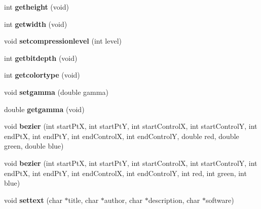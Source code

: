 \begin{DoxyCompactItemize}
\item 
\hypertarget{classpngwriter_a2359608ccf7fc25cbb271f49ebe5ea1e}{}int {\bfseries getheight} (void)\label{classpngwriter_a2359608ccf7fc25cbb271f49ebe5ea1e}

\item 
\hypertarget{classpngwriter_a66459b80d7c2380a5aa9139eafc5328c}{}int {\bfseries getwidth} (void)\label{classpngwriter_a66459b80d7c2380a5aa9139eafc5328c}

\item 
\hypertarget{classpngwriter_a338e4770832c68b109bf5ff514722c7c}{}void {\bfseries setcompressionlevel} (int level)\label{classpngwriter_a338e4770832c68b109bf5ff514722c7c}

\item 
\hypertarget{classpngwriter_aa851a74c99bfa6d426b1dfb2de470674}{}int {\bfseries getbitdepth} (void)\label{classpngwriter_aa851a74c99bfa6d426b1dfb2de470674}

\item 
\hypertarget{classpngwriter_a814068190845ff275a4b6377c8db6886}{}int {\bfseries getcolortype} (void)\label{classpngwriter_a814068190845ff275a4b6377c8db6886}

\item 
\hypertarget{classpngwriter_ac9dc81fca2f48ae6b9455672a255e231}{}void {\bfseries setgamma} (double gamma)\label{classpngwriter_ac9dc81fca2f48ae6b9455672a255e231}

\item 
\hypertarget{classpngwriter_a1103cd732336177a0acd57816b849927}{}double {\bfseries getgamma} (void)\label{classpngwriter_a1103cd732336177a0acd57816b849927}

\item 
\hypertarget{classpngwriter_a0a44e9268b006783d4b11f9b6d9012d3}{}void {\bfseries bezier} (int start\+Pt\+X, int start\+Pt\+Y, int start\+Control\+X, int start\+Control\+Y, int end\+Pt\+X, int end\+Pt\+Y, int end\+Control\+X, int end\+Control\+Y, double red, double green, double blue)\label{classpngwriter_a0a44e9268b006783d4b11f9b6d9012d3}

\item 
\hypertarget{classpngwriter_af29ac570c8d1e2eafbe6f43ed69e6829}{}void {\bfseries bezier} (int start\+Pt\+X, int start\+Pt\+Y, int start\+Control\+X, int start\+Control\+Y, int end\+Pt\+X, int end\+Pt\+Y, int end\+Control\+X, int end\+Control\+Y, int red, int green, int blue)\label{classpngwriter_af29ac570c8d1e2eafbe6f43ed69e6829}

\item 
\hypertarget{classpngwriter_abb1b975b6dabbf07856719eb98959110}{}void {\bfseries settext} (char $\ast$title, char $\ast$author, char $\ast$description, char $\ast$software)\label{classpngwriter_abb1b975b6dabbf07856719eb98959110}


\end{DoxyCompactItemize}
